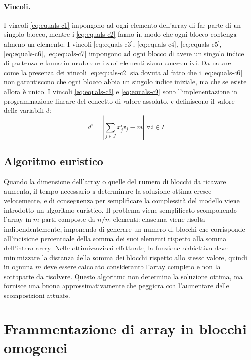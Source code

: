 \paragraph{Vincoli.} I vincoli \ref{eq:equals-c1} impongono ad ogni elemento dell'array di far parte di un singolo blocco, mentre i \ref{eq:equals-c2} fanno in modo che ogni blocco contenga almeno un elemento. I vincoli \ref{eq:equals-c3}, \ref{eq:equals-c4}, \ref{eq:equals-c5}, \ref{eq:equals-c6}, \ref{eq:equals-c7} impongono ad ogni blocco di avere un singolo indice di partenza e fanno in modo che i suoi elementi siano consecutivi. Da notare come la presenza dei vincoli \ref{eq:equals-c2} sia dovuta al fatto che i \ref{eq:equals-c6} non garantiscono che ogni blocco abbia un singolo indice iniziale, ma che se esiste allora è unico. I vincoli \ref{eq:equals-c8} e \ref{eq:equals-c9} sono l'implenentazione in programmazione lineare del concetto di valore assoluto, e definiscono il valore delle variabili $d$:
\begin{equation}
    d^i = \left| \sum_{j \in J}x^i_jv_j - m \right| ~ \forall i \in I
\end{equation}

\subsection{Algoritmo euristico}

Quando la dimensione dell'array o quelle del numero di blocchi da ricavare aumenta, il tempo necessario a determinare la soluzione ottima cresce velocemente, e di conseguenza per semplificare la complessità del modello viene introdotto un algoritmo euristico. Il problema viene semplificato scomponendo l'array in $m$ parti composte da $n/m$ elementi: ciascuna viene risolta indipendentemente, imponendo di generare un numero di blocchi che corrisponde all'incisione percentuale della somma dei suoi elementi rispetto alla somma dell'intero array. Nelle ottimizzazioni effettuate, la funzione obbiettivo deve minimizzare la distanza della somma dei blocchi rispetto allo stesso valore, quindi in ognuna $m$ deve essere calcolato consideranto l'array completo e non la sottoparte da risolvere. Questo algoritmo non determina la soluzione ottima, ma fornisce una buona approssimativamente che peggiora con l'aumentare delle scomposizioni attuate.


\section{Frammentazione di array in blocchi omogenei}
\label{sec:framm-omogenei}

